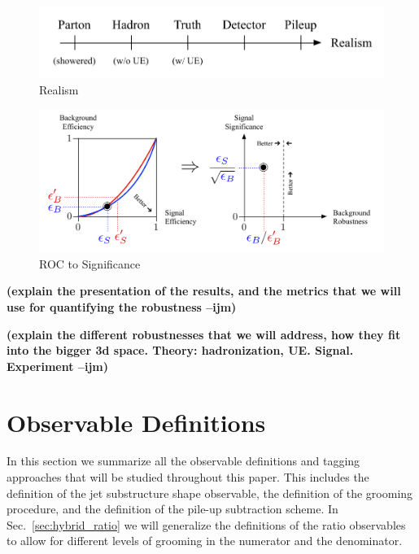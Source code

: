 \documentclass[11pt,letterpaper]{article}
\DeclareRobustCommand{\Sec}[1]{Sec.~\ref{#1}}
\newcommand{\ijm}[1]{\textbf{\textcolor{llblue}{(#1 --ijm)}}}
\begin{document}
\begin{figure}
\begin{center}
\includegraphics[width=0.75\columnwidth]{figures/realism_levels}
\end{center}
\caption{Realism}
\end{figure}


\begin{figure}
\begin{center}
\includegraphics[width=1.0\columnwidth]{figures/roc_to_significance}
\end{center}
\caption{ROC to Significance}
\end{figure}

\ijm{explain the presentation of the results, and the metrics that we will use for quantifying the robustness}



\ijm{explain the different robustnesses that we will address, how they fit into the bigger 3d space.
Theory: hadronization, UE. Signal. Experiment}



\section{Observable Definitions}

In this section we summarize all the observable definitions and tagging approaches that will be studied throughout this paper. This includes the definition of the jet substructure shape observable, the definition of the grooming procedure, and the definition of the pile-up subtraction scheme. In \Sec{sec:hybrid_ratio} we will generalize the definitions of the ratio observables to allow for different levels of grooming in the numerator and the denominator.
\end{document}
